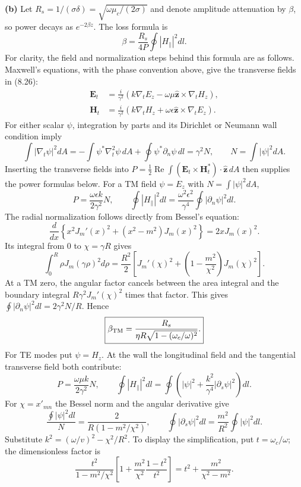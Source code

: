 \textbf{(b)} Let $R_s=1/(\sigma\delta)=\sqrt{\omega\mu_c/(2\sigma)}$
and denote amplitude attenuation by $\beta$, so power decays as
$e^{-2\beta z}$.  The loss formula is
\[
\beta=\frac{R_s}{4P}\oint|H_\parallel|^2dl.
\]
For clarity, the field and normalization steps behind this formula
are as follows. Maxwell's equations, with the phase convention above,
give the transverse fields in (8.26):
\begin{align*}
\mathbf E_t&=\frac{i}{\gamma^2}
  (k\nabla_tE_z-\omega\mu\widehat{\mathbf z}\times\nabla_tH_z),\\
\mathbf H_t&=\frac{i}{\gamma^2}
  (k\nabla_tH_z+\omega\epsilon\widehat{\mathbf z}\times\nabla_tE_z).
\end{align*}
For either scalar $\psi$, integration by parts and its Dirichlet
or Neumann wall condition imply
\[
\int|\nabla_t\psi|^2dA
=-\int\psi^*\nabla_t^2\psi\,dA
+\oint\psi^*\partial_n\psi\,dl=\gamma^2N,
\qquad N=\int|\psi|^2dA.
\]
Inserting the transverse fields into
$P=\tfrac12\operatorname{Re}\int(\mathbf E_t\times\mathbf H_t^*)
\cdot\widehat{\mathbf z}\,dA$ then supplies the power formulas below.
For a TM field $\psi=E_z$ with $N=\int|\psi|^2dA$,
\[
P=\frac{\omega\epsilon k}{2\gamma^2}N,\qquad
\oint|H_\parallel|^2dl
=\frac{\omega^2\epsilon^2}{\gamma^4}\oint|\partial_n\psi|^2dl.
\]
The radial normalization follows directly from Bessel's equation:
\[
\frac{d}{dx}\left\{x^2J_m'(x)^2+(x^2-m^2)J_m(x)^2\right\}
=2xJ_m(x)^2.
\]
Its integral from $0$ to $\chi=\gamma R$ gives
\[
\int_0^R\rho J_m(\gamma\rho)^2d\rho
=\frac{R^2}{2}\left[J_m'(\chi)^2+
\left(1-\frac{m^2}{\chi^2}\right)J_m(\chi)^2\right].
\]
At a TM zero, the angular factor cancels between the area integral
and the boundary integral $R\gamma^2J_m'(\chi)^2$ times that factor.
This gives
$\oint|\partial_n\psi|^2dl=2\gamma^2N/R$.  Hence
\[
\boxed{\beta_{\rm TM}=
\frac{R_s}{\eta R\sqrt{1-(\omega_c/\omega)^2}}.}
\]
For TE modes put $\psi=H_z$.  At the wall the longitudinal field
and the tangential transverse field both contribute:
\[
P=\frac{\omega\mu k}{2\gamma^2}N,\qquad
\oint|H_\parallel|^2dl
=\oint\left(|\psi|^2+\frac{k^2}{\gamma^4}|\partial_s\psi|^2\right)dl.
\]
For $\chi=x'_{mn}$ the Bessel norm and the angular derivative give
\[
\frac{\oint|\psi|^2dl}{N}=\frac{2}{R(1-m^2/\chi^2)},\qquad
\oint|\partial_s\psi|^2dl=\frac{m^2}{R^2}\oint|\psi|^2dl.
\]
Substitute $k^2=(\omega/v)^2-\chi^2/R^2$. To display the
simplification, put $t=\omega_c/\omega$; the dimensionless factor is
\[
\frac{t^2}{1-m^2/\chi^2}
\left[1+\frac{m^2}{\chi^2}\frac{1-t^2}{t^2}\right]
=t^2+\frac{m^2}{\chi^2-m^2}.
\]
